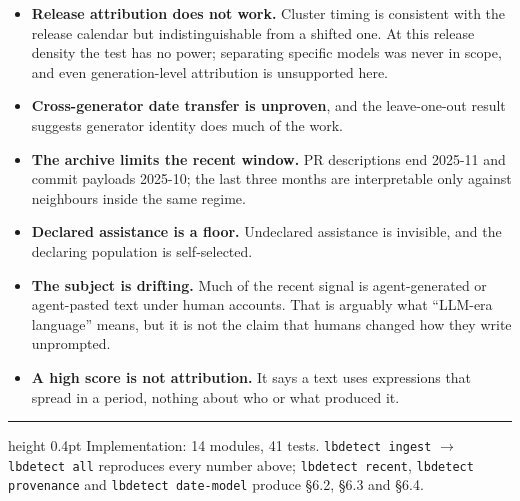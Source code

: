 \documentclass[11pt,a4paper]{article}
\begin{document}
\begin{itemize}
  \item \textbf{Release attribution does not work.} Cluster timing is consistent with
  the release calendar but indistinguishable from a shifted one. At this release
  density the test has no power; separating specific models was never in scope, and
  even generation-level attribution is unsupported here.
  \item \textbf{Cross-generator date transfer is unproven}, and the leave-one-out
  result suggests generator identity does much of the work.
  \item \textbf{The archive limits the recent window.} PR descriptions end 2025-11 and
  commit payloads 2025-10; the last three months are interpretable only against
  neighbours inside the same regime.
  \item \textbf{Declared assistance is a floor.} Undeclared assistance is invisible,
  and the declaring population is self-selected.
  \item \textbf{The subject is drifting.} Much of the recent signal is agent-generated
  or agent-pasted text under human accounts. That is arguably what ``LLM-era
  language'' means, but it is not the claim that humans changed how they write
  unprompted.
  \item \textbf{A high score is not attribution.} It says a text uses expressions that
  spread in a period, nothing about who or what produced it.
\end{itemize}

\vspace{0.4em}
\hrule height 0.4pt
\vspace{0.5em}
\noindent\footnotesize\color{ink2}
Implementation: 14 modules, 41 tests. \texttt{lbdetect ingest} $\to$
\texttt{lbdetect all} reproduces every number above; \texttt{lbdetect recent},
\texttt{lbdetect provenance} and \texttt{lbdetect date-model} produce
\S6.2, \S6.3 and \S6.4.
\end{document}
